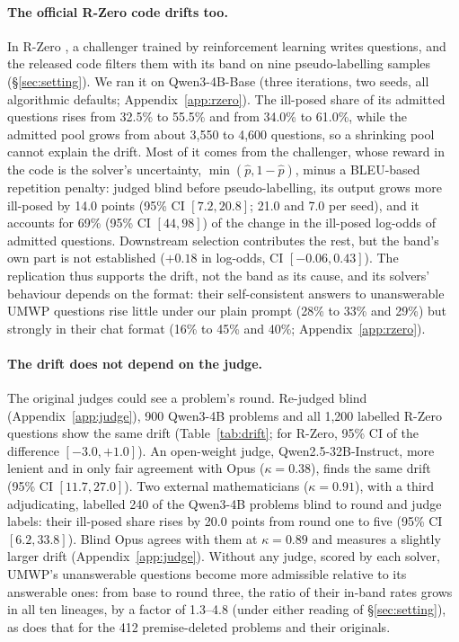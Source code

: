 \paragraph{The official R-Zero code drifts too.} In R-Zero \citep{huang2026rzero}, a challenger trained by reinforcement learning writes questions, and the released code filters them with its band on nine pseudo-labelling samples (\S\ref{sec:setting}). We ran it on Qwen3-4B-Base (three iterations, two seeds, all algorithmic defaults; Appendix~\ref{app:rzero}). The ill-posed share of its admitted questions rises from 32.5\% to 55.5\% and from 34.0\% to 61.0\%, while the admitted pool grows from about 3,550 to 4,600 questions, so a shrinking pool cannot explain the drift. Most of it comes from the challenger, whose reward in the code is the solver's uncertainty, $\min(\hat p, 1{-}\hat p)$, minus a BLEU-based repetition penalty: judged blind before pseudo-labelling, its output grows more ill-posed by 14.0 points (95\% CI $[7.2, 20.8]$; 21.0 and 7.0 per seed), and it accounts for 69\% (95\% CI $[44, 98]$) of the change in the ill-posed log-odds of admitted questions. Downstream selection contributes the rest, but the band's own part is not established ($+0.18$ in log-odds, CI $[-0.06, 0.43]$). The replication thus supports the drift, not the band as its cause, and its solvers' behaviour depends on the format: their self-consistent answers to unanswerable UMWP questions rise little under our plain prompt (28\% to 33\% and 29\%) but strongly in their chat format (16\% to 45\% and 40\%; Appendix~\ref{app:rzero}).

\paragraph{The drift does not depend on the judge.} The original judges could see a problem's round. Re-judged blind (Appendix~\ref{app:judge}), 900 Qwen3-4B problems and all 1,200 labelled R-Zero questions show the same drift (Table~\ref{tab:drift}; for R-Zero, 95\% CI of the difference $[-3.0, +1.0]$). An open-weight judge, Qwen2.5-32B-Instruct, more lenient and in only fair agreement with Opus ($\kappa{=}0.38$), finds the same drift (95\% CI $[11.7, 27.0]$). Two external mathematicians ($\kappa{=}0.91$), with a third adjudicating, labelled 240 of the Qwen3-4B problems blind to round and judge labels: their ill-posed share rises by 20.0 points from round one to five (95\% CI $[6.2, 33.8]$). Blind Opus agrees with them at $\kappa{=}0.89$ and measures a slightly larger drift (Appendix~\ref{app:judge}). Without any judge, scored by each solver, UMWP's unanswerable questions become more admissible relative to its answerable ones: from base to round three, the ratio of their in-band rates grows in all ten lineages, by a factor of 1.3--4.8 (under either reading of \S\ref{sec:setting}), as does that for the 412 premise-deleted problems and their originals.